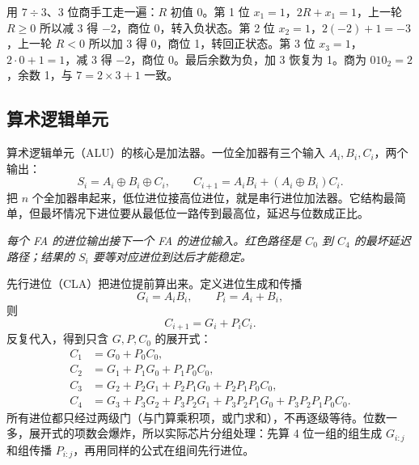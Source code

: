用 $7\div3$、3 位商手工走一遍：$R$ 初值 0。第 1 位 $x_1=1$，$2R+x_1=1$，上一轮 $R\ge0$ 所以减 3 得 $-2$，商位 0，转入负状态。第 2 位 $x_2=1$，$2(-2)+1=-3$，上一轮 $R<0$ 所以加 3 得 0，商位 1，转回正状态。第 3 位 $x_3=1$，$2\cdot0+1=1$，减 3 得 $-2$，商位 0。最后余数为负，加 3 恢复为 1。商为 $010_2=2$，余数 1，与 $7=2\times3+1$ 一致。

\subsection{算术逻辑单元}

算术逻辑单元（ALU）的核心是加法器。一位全加器有三个输入 $A_i,B_i,C_i$，两个输出：
\[
S_i=A_i\oplus B_i\oplus C_i,\qquad
C_{i+1}=A_iB_i+(A_i\oplus B_i)C_i.
\]
把 $n$ 个全加器串起来，低位进位接高位进位，就是串行进位加法器。它结构最简单，但最坏情况下进位要从最低位一路传到最高位，延迟与位数成正比。

\begin{center}
\par\vspace{2pt}
{\footnotesize\itshape 每个 FA 的进位输出接下一个 FA 的进位输入。红色路径是 $C_0$ 到 $C_4$ 的最坏延迟路径；结果的 $S_i$ 要等对应进位到达后才能稳定。}
\end{center}

先行进位（CLA）把进位提前算出来。定义进位生成和传播
\[
G_i=A_iB_i,\qquad P_i=A_i+B_i,
\]
则
\[
C_{i+1}=G_i+P_iC_i.
\]
反复代入，得到只含 $G,P,C_0$ 的展开式：
\begin{align*}
C_1&=G_0+P_0C_0,\\
C_2&=G_1+P_1G_0+P_1P_0C_0,\\
C_3&=G_2+P_2G_1+P_2P_1G_0+P_2P_1P_0C_0,\\
C_4&=G_3+P_3G_2+P_3P_2G_1+P_3P_2P_1G_0+P_3P_2P_1P_0C_0.
\end{align*}
所有进位都只经过两级门（与门算乘积项，或门求和），不再逐级等待。位数一多，展开式的项数会爆炸，所以实际芯片分组处理：先算 4 位一组的组生成 $G_{i:j}$ 和组传播 $P_{i:j}$，再用同样的公式在组间先行进位。

